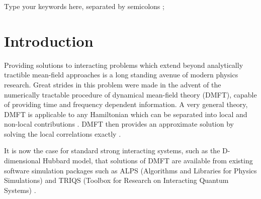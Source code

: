 \documentclass[3p,times,procedia]{elsarticle}
\begin{document}
\begin{frontmatter}
\begin{keyword}
Type your keywords here, separated by semicolons ; 




\end{keyword}
\end{frontmatter}




\vspace*{-8pt}

\listoftodos
\section{Introduction}

Providing solutions to interacting problems which extend beyond analytically tractible mean-field approaches is a long standing avenue of modern physics research.  Great strides in this problem were made in the advent of the numerically tractable procedure of dynamical mean-field theory (DMFT), capable of providing time and frequency dependent information.  A very general theory, DMFT is applicable to any Hamiltonian which can be separated into local and non-local contributions \cite{KotliarSavrasov:2006}.  DMFT then provides an approximate solution by solving the local correlations exactly \cite{MetznerVollhardt:1989}.

It is now the case for standard strong interacting systems, such as the D-dimensional Hubbard model, that solutions of DMFT are available from existing software simulation packages such as ALPS (Algorithms and Libraries for Physics Simulations) \cite{Albuquerque2007} and TRIQS (Toolbox for Research on Interacting Quantum Systems) \cite{TRIQS}.
\end{document}
